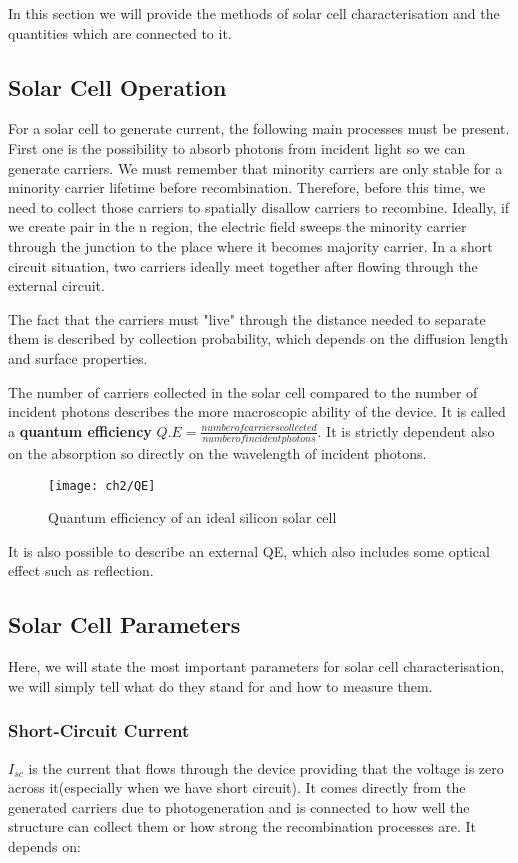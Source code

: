 In this section we will provide the methods of solar cell characterisation and the quantities which are connected to it.
 
\subsection{Solar Cell Operation}

For a solar cell to generate current, the following main processes must be present. First one is the possibility to absorb photons from incident light so we can generate carriers. We must remember that minority carriers are only stable for a minority carrier lifetime before recombination. Therefore, before this time, we need to collect those carriers to spatially disallow carriers to recombine. Ideally, if we create pair in the n region, the electric field sweeps the minority carrier through the junction to the place where it becomes majority carrier. In a short circuit situation, two carriers ideally meet together after flowing through the external circuit. 

The fact that the carriers must "live" through the distance needed to separate them is described by collection probability, which depends on the diffusion length and surface properties. 

The number of carriers collected in the solar cell compared to the number of incident photons describes the more macroscopic ability of the device. It is called a \textbf{quantum efficiency} $Q.E=\frac{number of carriers collected}{number of incident photons}$. It is strictly dependent also on the absorption so directly on the wavelength of incident photons. 

\begin{figure}
\centering
\texttt{[image: ch2/QE]}
\caption{Quantum efficiency of an ideal silicon solar cell \cite{pv}}
\end{figure}

It is also possible to describe an external QE, which also includes some optical effect such as reflection. 

\subsection{Solar Cell Parameters}
Here, we will state the most important parameters for solar cell characterisation, we will simply tell what do they stand for and how to measure them. 

\subsubsection{Short-Circuit Current}
$I_{sc}$ is the current that flows through the device providing that the voltage is zero across it(especially when we have short circuit). It comes directly from the generated carriers due to photogeneration and is connected to how well the structure can collect them or how strong the recombination processes are. It depends on:

